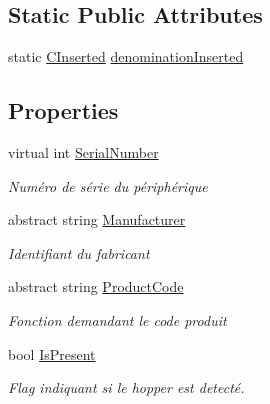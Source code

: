 \subsection*{Static Public Attributes}
\begin{DoxyCompactItemize}
\item 
static \mbox{\hyperlink{class_device_library_1_1_c_device_1_1_c_inserted}{C\+Inserted}} \mbox{\hyperlink{class_device_library_1_1_c_device_aa37ddd8fa2c4edfc974ce0865e20d37a}{denomination\+Inserted}}
\end{DoxyCompactItemize}
\subsection*{Properties}
\begin{DoxyCompactItemize}
\item 
virtual int \mbox{\hyperlink{class_device_library_1_1_c_device_a5d542b0634e0024751d1e6df6975e0b8}{Serial\+Number}}
\begin{DoxyCompactList}\small\item\em Numéro de série du périphérique \end{DoxyCompactList}\item 
abstract string \mbox{\hyperlink{class_device_library_1_1_c_device_a15613af54894a9dd673f76ac539741b1}{Manufacturer}}
\begin{DoxyCompactList}\small\item\em Identifiant du fabricant \end{DoxyCompactList}\item 
abstract string \mbox{\hyperlink{class_device_library_1_1_c_device_adb37480555a37555da8fc17c73196fda}{Product\+Code}}
\begin{DoxyCompactList}\small\item\em Fonction demandant le code produit \end{DoxyCompactList}\item 
bool \mbox{\hyperlink{class_device_library_1_1_c_device_a72aa72778cf6f58e44f7048f8f86fe2f}{Is\+Present}}
\begin{DoxyCompactList}\small\item\em Flag indiquant si le hopper est detecté. \end{DoxyCompactList}\end{DoxyCompactItemize}


